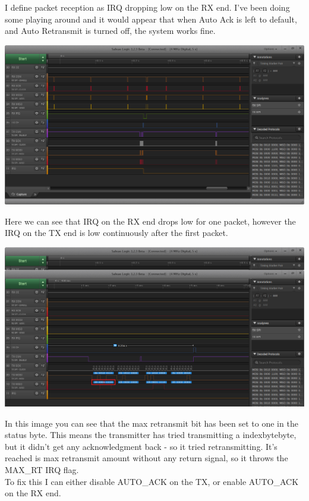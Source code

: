     		I define packet reception as IRQ dropping low on the RX end. I've been doing some playing around and it would appear that when Auto Ack is left to default, and Auto Retransmit is turned off, the system works fine.\\
    		
    		\centerline{\includegraphics[width=0.75\linewidth]{images/30_08_2015_IRQ}}
    		\vspace{10pt}
    		
    		Here we can see that IRQ on the RX end drops low for one packet, however the IRQ on the TX end is low continuously after the first packet.\\
    		
    		\centerline{\includegraphics[width=0.75\linewidth]{images/30_08_2015_RTRM}}
    		\vspace{10pt}
    		
    		In this image you can see that the max retransmit bit has been set to one in the status byte. This means the transmitter has tried transmitting a index{byte}byte, but it didn't get any acknowledgment back - so it tried retransmitting. It's reached is max retransmit amount without any return signal, so it throws the MAX\_RT IRQ flag.\\
    		
    		To fix this I can either disable AUTO\_ACK on the TX, or enable AUTO\_ACK on the RX end.\\
    		
